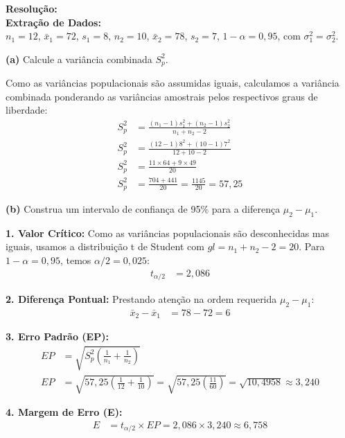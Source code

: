 \documentclass[12pt, a4paper]{article}
\begin{document}
\vspace{0.3cm}
\noindent\textbf{Resolução:}\\
\textbf{Extração de Dados:} \\
$n_1 = 12$, $\bar{x}_1 = 72$, $s_1 = 8$, $n_2 = 10$, $\bar{x}_2 = 78$, $s_2 = 7$, $1-\alpha = 0,95$, com $\sigma_1^2 = \sigma_2^2$.

\medskip\noindent\textbf{(a)} Calcule a variância combinada $S^2_p$.

\noindent Como as variâncias populacionais são assumidas iguais, calculamos a variância combinada ponderando as variâncias amostrais pelos respectivos graus de liberdade:
\begin{align*}
S^2_p &= \frac{(n_1 - 1)s_1^2 + (n_2 - 1)s_2^2}{n_1 + n_2 - 2} \\
S^2_p &= \frac{(12 - 1)8^2 + (10 - 1)7^2}{12 + 10 - 2} \\
S^2_p &= \frac{11 \times 64 + 9 \times 49}{20} \\
S^2_p &= \frac{704 + 441}{20} = \frac{1145}{20} = \boxed{57,25}
\end{align*}

\medskip\noindent\textbf{(b)} Construa um intervalo de confiança de 95\% para a diferença $\mu_2 - \mu_1$.

\noindent \textbf{1. Valor Crítico:} Como as variâncias populacionais são desconhecidas mas iguais, usamos a distribuição t de Student com $gl = n_1 + n_2 - 2 = 20$. Para $1-\alpha = 0,95$, temos $\alpha/2 = 0,025$:
\begin{align*}
t_{\alpha/2} &= \boxed{2,086}
\end{align*}

\noindent \textbf{2. Diferença Pontual:} Prestando atenção na ordem requerida $\mu_2 - \mu_1$:
\begin{align*}
\bar{x}_2 - \bar{x}_1 &= 78 - 72 = \boxed{6}
\end{align*}

\noindent \textbf{3. Erro Padrão (EP):}
\begin{align*}
EP &= \sqrt{S^2_p \left( \frac{1}{n_1} + \frac{1}{n_2} \right)} \\
EP &= \sqrt{57,25 \left( \frac{1}{12} + \frac{1}{10} \right)} = \sqrt{57,25 \left( \frac{11}{60} \right)} = \sqrt{10,4958} \approx \boxed{3,240}
\end{align*}

\noindent \textbf{4. Margem de Erro (E):}
\begin{align*}
E &= t_{\alpha/2} \times EP = 2,086 \times 3,240 \approx \boxed{6,758}
\end{align*}
\end{document}

